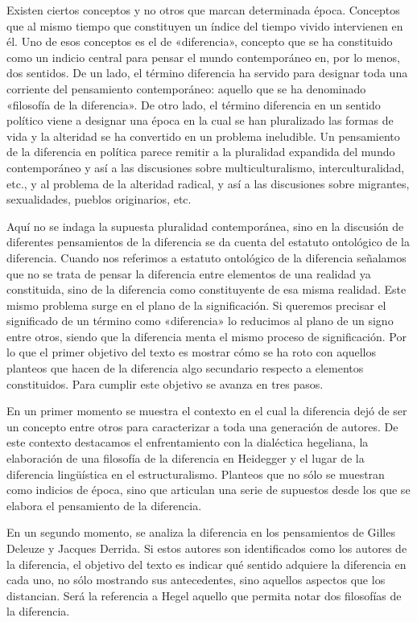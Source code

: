 Existen ciertos conceptos y no otros que marcan determinada época. Conceptos que al mismo tiempo que constituyen un índice del tiempo vivido intervienen en él. Uno de esos conceptos es el de «diferencia», concepto que se ha constituido como un indicio central para pensar el mundo contemporáneo en, por lo menos, dos sentidos. De un lado, el término diferencia ha servido para designar toda una corriente del pensamiento contemporáneo: aquello que se ha denominado «filosofía de la diferencia». De otro lado, el término diferencia en un sentido político viene a designar una época en la cual se han pluralizado las formas de vida y la alteridad se ha convertido en un problema ineludible. Un pensamiento de la diferencia en política parece remitir a la pluralidad expandida del mundo contemporáneo y así a las discusiones sobre multiculturalismo, interculturalidad, etc., y al problema de la alteridad radical, y así a las discusiones sobre migrantes, sexualidades, pueblos originarios, etc.

Aquí no se indaga la supuesta pluralidad contemporánea, sino en la discusión de diferentes pensamientos de la diferencia se da cuenta del estatuto ontológico de la diferencia. Cuando nos referimos a estatuto ontológico de la diferencia señalamos que no se trata de pensar la diferencia entre elementos de una realidad ya constituida, sino de la diferencia como constituyente de esa misma realidad. Este mismo problema surge en el plano de la significación. Si queremos precisar el significado de un término como «diferencia» lo reducimos al plano de un signo entre otros, siendo que la diferencia menta el mismo proceso de significación. Por lo que el primer objetivo del texto es mostrar cómo se ha roto con aquellos planteos que hacen de la diferencia algo secundario respecto a elementos constituidos. Para cumplir este objetivo se avanza en tres pasos.

En un primer momento se muestra el contexto en el cual la diferencia dejó de ser un concepto entre otros para caracterizar a toda una generación de autores. De este contexto destacamos el enfrentamiento con la dialéctica hegeliana, la elaboración de una filosofía de la diferencia en Heidegger y el lugar de la diferencia lingüística en el estructuralismo. Planteos que no sólo se muestran como indicios de época, sino que articulan una serie de supuestos desde los que se elabora el pensamiento de la diferencia.

En un segundo momento, se analiza la diferencia en los pensamientos de Gilles Deleuze y Jacques Derrida. Si estos autores son identificados como los autores de la diferencia, el objetivo del texto es indicar qué sentido adquiere la diferencia en cada uno, no sólo mostrando sus antecedentes, sino aquellos aspectos que los distancian. Será la referencia a Hegel aquello que permita notar dos filosofías de la diferencia.

